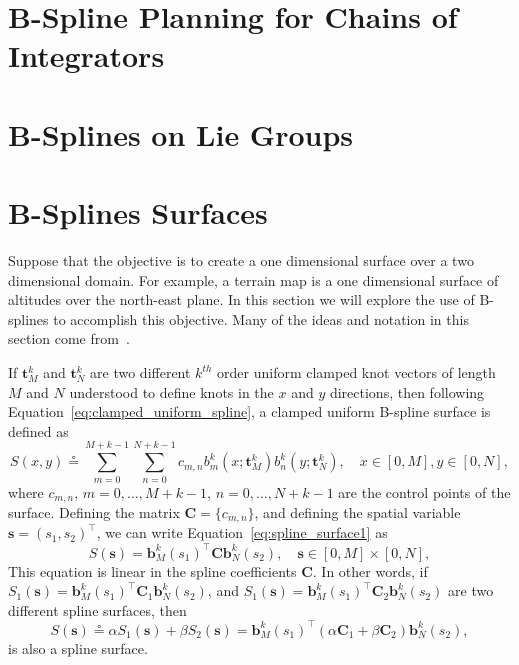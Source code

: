 \documentclass{article}
\newcommand{\defeq}{\circeq}
\newcommand{\bbf}{\mathbf{b}}
\newcommand{\sbf}{\mathbf{s}}
\newcommand{\Cbf}{\mathbf{C}}
\begin{document}
\section{B-Spline Planning for Chains of Integrators}

\section{B-Splines on Lie Groups}

\section{B-Splines Surfaces}

Suppose that the objective is to create a one dimensional surface over a two dimensional domain.  For example, a terrain map is a one dimensional surface of altitudes over the north-east plane.  In this section we will explore the use of B-splines to accomplish this objective. Many of the ideas and notation in this section come from~\cite{RodriguesTsiogkasAguiar20}.

If $\mathbf{t}_M^k$ and $\mathbf{t}_N^k$ are two different $k^{th}$ order uniform clamped knot vectors of length $M$ and $N$ understood to define knots in the $x$ and $y$ directions, then following Equation~\eqref{eq:clamped_uniform_spline}, a clamped uniform B-spline surface is defined as 
\begin{equation}\label{eq:spline_surface1}
S(x, y) \defeq \sum_{m=0}^{M+k-1} \sum_{n=0}^{N+k-1} c_{m,n} b^k_m(x; \mathbf{t}_M^k) b^k_n(y; \mathbf{t}_N^k), \quad x\in[0,M], y\in[0, N],
\end{equation}
where $c_{m, n}$, $m=0, \dots, M+k-1$, $n=0, \dots, N+k-1$ are the control points of the surface.  Defining the matrix $\Cbf=\{c_{m,n}\}$, and defining the spatial variable $\sbf = (s_1, s_2)^\top$, we can write Equation~\eqref{eq:spline_surface1} as
\begin{equation}\label{eq:spline_surface2}
S(\sbf) = \bbf^k_M(s_1)^\top \Cbf \bbf^k_N(s_2), \quad \sbf\in[0, M]\times[0, N],
\end{equation}
This equation is linear in the spline coefficients $\Cbf$.  In other words, if $S_1(\sbf)=\bbf^k_M(s_1)^\top \Cbf_1 \bbf^k_N(s_2)$, and $S_1(\sbf)=\bbf^k_M(s_1)^\top \Cbf_2 \bbf^k_N(s_2)$ are two different spline surfaces, then 
\[
S(\sbf)\defeq \alpha S_1(\sbf) + \beta S_2(\sbf) = \bbf^k_M(s_1)^\top \left(\alpha\Cbf_1 + \beta\Cbf_2\right) \bbf^k_N(s_2),
\]
is also a spline surface.
\end{document}
